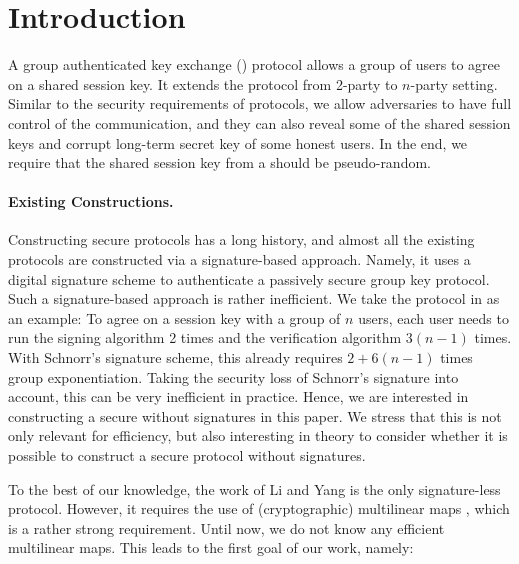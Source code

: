 \newcommand{\introGAKE}{\text{GAKE}\xspace}
\newcommand{\introAKE}{\text{AKE}\xspace}
\newcommand{\introNumSess}{s}
\newcommand{\introNumUser}{n}
\newcommand{\reduction}{\mathcal{R}}


\section{Introduction}\label{sec:introduction}

A group authenticated key exchange (\introGAKE) protocol allows a group of users to agree on a shared session key. It extends the \introAKE protocol from 2-party to $n$-party setting. Similar to the security requirements of \introAKE protocols, we allow adversaries to have full control of the communication, and they can also reveal some of the shared session keys and corrupt long-term secret key of some honest users. 
In the end, we require that the shared session key from a \introGAKE should be pseudo-random.

\paragraph{Existing Constructions.}
Constructing secure \introGAKE protocols has a long history, and almost all the existing protocols \cite{CCS:BCPQ01,AC:BreChePoi01,EC:BreChePoi02,PQCRYPTO:ADGK19,JC:PanQiaRin22} are constructed via a signature-based approach. Namely, it uses a digital signature scheme to authenticate a passively secure group key protocol. Such a signature-based approach is rather inefficient. We take the protocol in \cite{JC:PanQiaRin22} as an example: To agree on a session key with a group of $n$ users, each user needs to run the signing algorithm 2 times and the verification algorithm $3(n-1)$ times. With Schnorr's signature scheme, this already requires $2+6(n-1)$ times group exponentiation. Taking the security loss of Schnorr's signature into account, this can be very inefficient in practice. Hence, we are interested in constructing a secure \introGAKE without signatures in this paper.
We stress that this is not only relevant for efficiency, but also interesting in theory to consider  whether it is possible to construct a secure \introGAKE protocol without signatures.

To the best of our knowledge, the work of Li and Yang \cite{CANS:LiYan13} is the only signature-less \introGAKE protocol. However, it requires the use of (cryptographic) multilinear maps \cite{EC:GarGenHal13}, which is a rather strong requirement. Until now, we do not know any efficient multilinear maps. 
This leads to the first goal of our work, namely:

